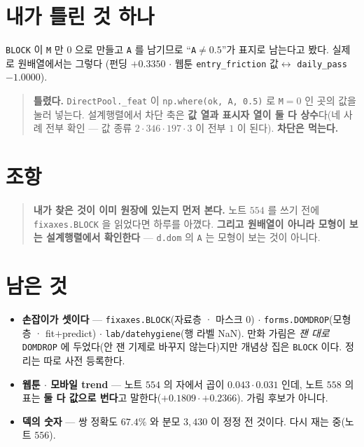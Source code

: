 \documentclass[11pt]{article}
\begin{document}
\section*{내가 틀린 것 하나}

\texttt{BLOCK} 이 \texttt{M} 만 $0$ 으로 만들고 \texttt{A} 를 남기므로
``\texttt{A}$\ne$$0.5$''가 표지로 남는다고 봤다. 실제로 원배열에서는 그렇다
(펀딩 $+0.3350$ $\cdot$ 웹툰 \texttt{entry\_friction} 값$\leftrightarrow$
\texttt{daily\_pass} $-1.0000$).

\begin{quote}
\textbf{틀렸다.} \texttt{DirectPool.\_feat} 이
\texttt{np.where(ok, A, 0.5)} 로 \texttt{M}$=$$0$ 인 곳의 값을 눌러 넣는다.
설계행렬에서 차단 축은 \textbf{값 열과 표시자 열이 둘 다 상수}다(네 사례
전부 확인 --- 값 종류 $2 \cdot 346 \cdot 197 \cdot 3$ 이 전부 $1$ 이 된다).
\textbf{차단은 먹는다.}
\end{quote}

\section*{조항}

\begin{quote}
\textbf{내가 찾은 것이 이미 원장에 있는지 먼저 본다.} 노트 $554$ 를 쓰기 전에
\texttt{fixaxes.BLOCK} 을 읽었다면 하루를 아꼈다. \textbf{그리고 원배열이
아니라 모형이 보는 설계행렬에서 확인한다} --- \texttt{d.dom} 의
\texttt{A} 는 모형이 보는 것이 아니다.
\end{quote}

\section*{남은 것}

\begin{itemize}
\item \textbf{손잡이가 셋이다} --- \texttt{fixaxes.BLOCK}(자료층 · 마스크 $0$)
$\cdot$ \texttt{forms.DOMDROP}(모형층 · fit$+$predict) $\cdot$
\texttt{lab/datehygiene}(행 라벨 NaN). 만화 가림은 \emph{잰 대로}
\texttt{DOMDROP} 에 두었다(안 잰 기제로 바꾸지 않는다)지만 개념상 집은
\texttt{BLOCK} 이다. 정리는 따로 사전 등록한다.
\item \textbf{웹툰 $\cdot$ 모바일 trend} --- 노트 $554$ 의 자에서 곱이
$0.043 \cdot 0.031$ 인데, 노트 $558$ 의 표는 \textbf{둘 다 값으로 번다}고
말한다($+0.1809 \cdot +0.2366$). 가림 후보가 아니다.
\item \textbf{덱의 숫자} --- 쌍 정확도 $67.4\%$ 와 분모 $3{,}430$ 이 정정 전
것이다. 다시 재는 중(노트 $556$).
\end{itemize}
\end{document}

